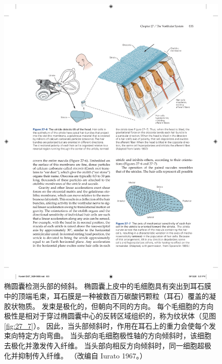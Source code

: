 \begin{figure}[htbp]
	\centering
	\includegraphics[width=0.9\linewidth]{chap27/fig_27_6}
	\caption{椭圆囊检测头部的倾斜。 椭圆囊上皮中的毛细胞具有突出到耳石膜中的顶端毛束，耳石膜是一种被数百万碳酸钙颗粒（耳石）覆盖的凝胶状物质。 发束是极化的，但朝向不同的方向。 每个毛细胞的方向极性是相对于穿过椭圆囊中心的反转区域组织的，称为纹状体（见图 \ref{fig:27_7}）。 因此，当头部倾斜时，作用在耳石上的重力会使每个发束向特定方向弯曲。 当头部向毛细胞极性轴的方向倾斜时，该细胞去极化并激发传入纤维。 当头部向相反方向倾斜时，同一细胞超极化并抑制传入纤维。 （改编自 Iurato 1967。）}
	\label{fig:27_6}
\end{figure}

